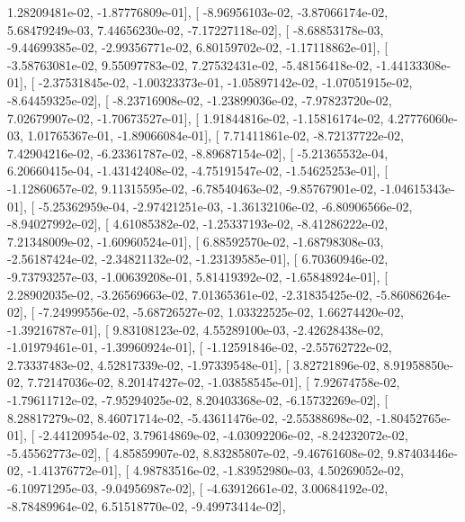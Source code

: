 \documentclass{article}
\begin{document}
          1.28209481e-02,  -1.87776809e-01],
       [ -8.96956103e-02,  -3.87066174e-02,   5.68479249e-03,
          7.44656230e-02,  -7.17227118e-02],
       [ -8.68853178e-03,  -9.44699385e-02,  -2.99356771e-02,
          6.80159702e-02,  -1.17118862e-01],
       [ -3.58763081e-02,   9.55097783e-02,   7.27532431e-02,
         -5.48156418e-02,  -1.44133308e-01],
       [ -2.37531845e-02,  -1.00323373e-01,  -1.05897142e-02,
         -1.07051915e-02,  -8.64459325e-02],
       [ -8.23716908e-02,  -1.23899036e-02,  -7.97823720e-02,
          7.02679907e-02,  -1.70673527e-01],
       [  1.91844816e-02,  -1.15816174e-02,   4.27776060e-03,
          1.01765367e-01,  -1.89066084e-01],
       [  7.71411861e-02,  -8.72137722e-02,   7.42904216e-02,
         -6.23361787e-02,  -8.89687154e-02],
       [ -5.21365532e-04,   6.20660415e-04,  -1.43142408e-02,
         -4.75191547e-02,  -1.54625253e-01],
       [ -1.12860657e-02,   9.11315595e-02,  -6.78540463e-02,
         -9.85767901e-02,  -1.04615343e-01],
       [ -5.25362959e-04,  -2.97421251e-03,  -1.36132106e-02,
         -6.80906566e-02,  -8.94027992e-02],
       [  4.61085382e-02,  -1.25337193e-02,  -8.41286222e-02,
          7.21348009e-02,  -1.60960524e-01],
       [  6.88592570e-02,  -1.68798308e-03,  -2.56187424e-02,
         -2.34821132e-02,  -1.23139585e-01],
       [  6.70360946e-02,  -9.73793257e-03,  -1.00639208e-01,
          5.81419392e-02,  -1.65848924e-01],
       [  2.28902035e-02,  -3.26569663e-02,   7.01365361e-02,
         -2.31835425e-02,  -5.86086264e-02],
       [ -7.24999556e-02,  -5.68726527e-02,   1.03322525e-02,
          1.66274420e-02,  -1.39216787e-01],
       [  9.83108123e-02,   4.55289100e-03,  -2.42628438e-02,
         -1.01979461e-01,  -1.39960924e-01],
       [ -1.12591846e-02,  -2.55762722e-02,   2.73337483e-02,
          4.52817339e-02,  -1.97339548e-01],
       [  3.82721896e-02,   8.91958850e-02,   7.72147036e-02,
          8.20147427e-02,  -1.03858545e-01],
       [  7.92674758e-02,  -1.79611712e-02,  -7.95294025e-02,
          8.20403368e-02,  -6.15732269e-02],
       [  8.28817279e-02,   8.46071714e-02,  -5.43611476e-02,
         -2.55388698e-02,  -1.80452765e-01],
       [ -2.44120954e-02,   3.79614869e-02,  -4.03092206e-02,
         -8.24232072e-02,  -5.45562773e-02],
       [  4.85859907e-02,   8.83285807e-02,  -9.46761608e-02,
          9.87403446e-02,  -1.41376772e-01],
       [  4.98783516e-02,  -1.83952980e-03,   4.50269052e-02,
         -6.10971295e-03,  -9.04956987e-02],
       [ -4.63912661e-02,   3.00684192e-02,  -8.78489964e-02,
          6.51518770e-02,  -9.49973414e-02],
\end{document}
